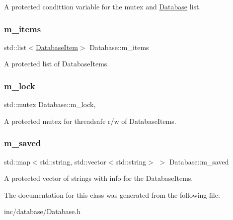 A protected condittion variable for the mutex and \hyperlink{classDatabase}{Database} list. 

\mbox{\label{classDatabase_a5a4ac1f3bf0f5fd77a696174ad9e5c45}} 
\subsubsection{\texorpdfstring{m\+\_\+items}{m\_items}}
{\footnotesize\ttfamily std\+::list$<$\hyperlink{classDatabaseItem}{Database\+Item}$>$ Database\+::m\+\_\+items\hspace{0.3cm}{\ttfamily [protected]}}



A protected list of Database\+Items. 

\mbox{\label{classDatabase_a7f55f3a5d93c9694ee4f08a2f2135b1d}} 
\subsubsection{\texorpdfstring{m\+\_\+lock}{m\_lock}}
{\footnotesize\ttfamily std\+::mutex Database\+::m\+\_\+lock\hspace{0.3cm}{\ttfamily [mutable]}, {\ttfamily [protected]}}



A protected mutex for threadsafe r/w of Database\+Items. 

\mbox{\label{classDatabase_a9f87cbe5a1be71d541083dffa8d8c9ad}} 
\subsubsection{\texorpdfstring{m\+\_\+saved}{m\_saved}}
{\footnotesize\ttfamily std\+::map$<$std\+::string, std\+::vector$<$std\+::string$>$ $>$ Database\+::m\+\_\+saved\hspace{0.3cm}{\ttfamily [protected]}}



A protected vector of strings with info for the Database\+Items. 



The documentation for this class was generated from the following file\+:\begin{DoxyCompactItemize}
\item 
inc/database/Database.\+h\end{DoxyCompactItemize}
